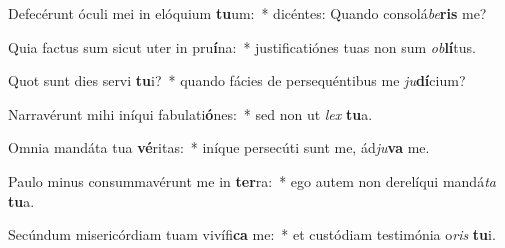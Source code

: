 \item Defecérunt óculi mei in elóquium \textbf{tu}um:~* dicéntes: Quando consolá\textit{be}\textbf{ris} me?
\item Quia factus sum sicut uter in pru\textbf{í}na:~* justificatiónes tuas non sum \textit{ob}\textbf{lí}tus.
\item Quot sunt dies servi \textbf{tu}i?~* quando fácies de persequéntibus me \textit{ju}\textbf{dí}cium?
\item Narravérunt mihi iníqui fabulati\textbf{ó}nes:~* sed non ut \textit{lex} \textbf{tu}a.
\item Omnia mandáta tua \textbf{vé}ritas:~* iníque persecúti sunt me, ád\textit{ju}\textbf{va} me.
\item Paulo minus consummavérunt me in \textbf{ter}ra:~* ego autem non derelíqui mandá\textit{ta} \textbf{tu}a.
\item Secúndum misericórdiam tuam vivífi\textbf{ca} me:~* et custódiam testimónia o\textit{ris} \textbf{tu}i.
